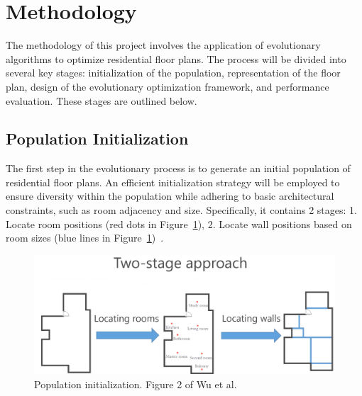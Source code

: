 \documentclass[]{article}
\begin{document}
\section{Methodology}
The methodology of this project involves the application of evolutionary algorithms to optimize residential floor plans. The process will be divided into several key stages: initialization of the population, representation of the floor plan, design of the evolutionary optimization framework, and performance evaluation. These stages are outlined below.

\subsection{Population Initialization}
The first step in the evolutionary process is to generate an initial population of residential floor plans. An efficient initialization strategy will be employed to ensure diversity within the population while adhering to basic architectural constraints, such as room adjacency and size. Specifically, it contains 2 stages: 1. Locate room positions (red dots in Figure~\ref{fig2}), 2. Locate wall positions based on room sizes (blue lines in Figure~\ref{fig2})~\cite{10.1145/3355089.3356556}.
\begin{figure}
  \centering
  \includegraphics[width=\textwidth]{image3.png}
  \caption{Population initialization. Figure 2 of Wu et al.~\cite{10.1145/3355089.3356556}}\label{fig2}
\end{figure}
\end{document}
